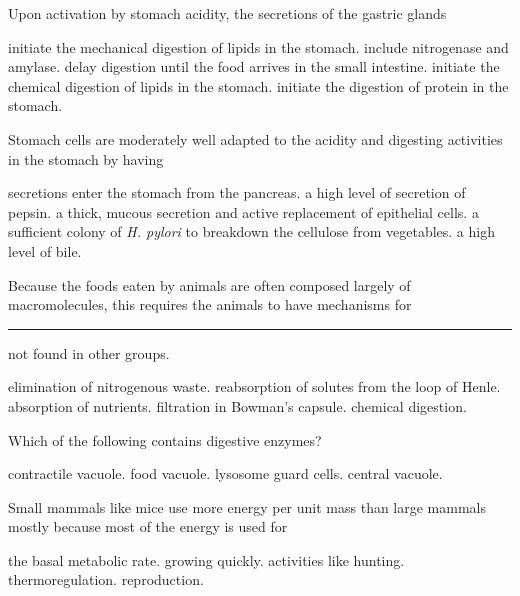 
\question
Upon activation by stomach acidity, the secretions of the gastric glands

\begin{choices}
\choice initiate the mechanical digestion of lipids in the stomach. 
\choice include nitrogenase and amylase. 
\choice delay digestion until the food arrives in the small intestine. 
\choice initiate the chemical digestion of lipids in the stomach.  
\correctchoice initiate the digestion of protein in the stomach. 
\end{choices}

\question
Stomach cells are moderately well adapted to the acidity and digesting activities in the stomach by having

\begin{choices}
\choice secretions enter the stomach from the pancreas. 
\choice a high level of secretion of pepsin. 
\correctchoice a thick, mucous secretion and active replacement of epithelial cells. 
\choice a sufficient colony of \textit{H. pylori} to breakdown the cellulose from vegetables. 
\choice a high level of bile. 
\end{choices}

\question
Because the foods eaten by animals are often composed largely of macromolecules, this requires the animals to have mechanisms for \rule{1in}{0.4pt} not found in other groups.

\begin{choices}
\choice elimination of nitrogenous waste. 
\choice reabsorption of solutes from the loop of Henle. 
\choice absorption of nutrients. 
\choice filtration in Bowman's capsule. 
\correctchoice chemical digestion. 
\end{choices}

\question
Which of the following contains digestive enzymes?

\begin{choices}
\choice contractile vacuole. 
\choice food vacuole. 
\correctchoice lysosome 
\choice guard cells. 
\choice central vacuole. 
\end{choices}

\question
Small mammals like mice use more energy per unit mass than large mammals mostly because most of the energy is used for

\begin{choices}
\choice the basal metabolic rate. 
\choice growing quickly. 
\choice activities like hunting. 
\correctchoice thermoregulation. 
\choice reproduction. 
\end{choices}

